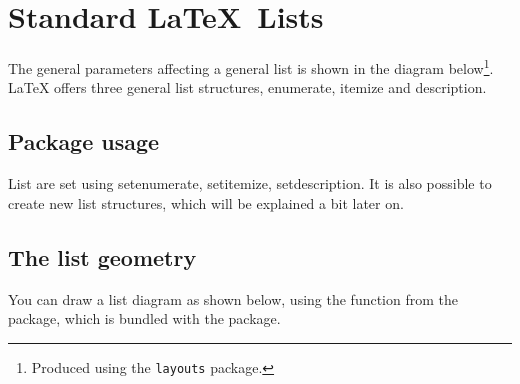 \begingroup


%

\chapter{Standard \LaTeX\ Lists}


The general parameters affecting a general list is shown in the  diagram  below\footnote{Produced using the \texttt{layouts} package.}. LaTeX offers three general list structures, enumerate, itemize and description.

\section{Package usage}

List are set using setenumerate, setitemize, setdescription. It is also possible to create new list structures, which will be explained a bit later on.

\section{The list geometry}

You can draw a list diagram as shown below, using the function  from
the  package, which is bundled with the  package.

